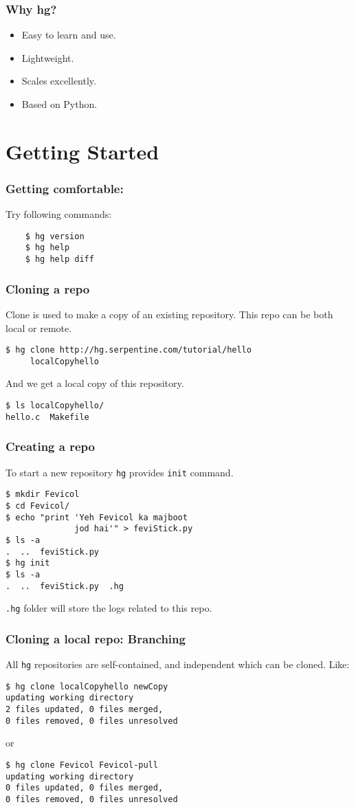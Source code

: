\documentclass[14pt,compress]{beamer}
\newcommand{\typ}[1]{\lstinline{#1}}
\begin{document}
\begin{frame}
  \frametitle{Why hg?}
  \begin{itemize}
  \item Easy to learn and use.
  \item Lightweight.
  \item Scales excellently.
  \item Based on Python.
  \end{itemize}
\end{frame}

\section{Getting Started}

\begin{frame}[fragile]
  \frametitle{Getting comfortable:}
  Try following commands:
  \begin{lstlisting}
    $ hg version    
    $ hg help
    $ hg help diff
  \end{lstlisting} %
\end{frame}

\begin{frame}[fragile]
  \frametitle{Cloning a repo}
  Clone is used to make a copy of an existing repository. This repo can be both local or remote.
  \begin{lstlisting}
$ hg clone http://hg.serpentine.com/tutorial/hello 
     localCopyhello
  \end{lstlisting}
  And we get a local copy of this repository. 
  \begin{lstlisting}
$ ls localCopyhello/
hello.c  Makefile
  \end{lstlisting}
\end{frame}

\begin{frame}[fragile]
  \frametitle{Creating a repo}
  To start a new repository \typ{hg} provides \typ{init} command.
  \begin{lstlisting}
$ mkdir Fevicol
$ cd Fevicol/
$ echo "print 'Yeh Fevicol ka majboot 
              jod hai'" > feviStick.py
$ ls -a
.  ..  feviStick.py
$ hg init
$ ls -a
.  ..  feviStick.py  .hg
  \end{lstlisting}
\typ{.hg} folder will store the logs related to this repo.
\end{frame}

\begin{frame}[fragile]
  \frametitle{Cloning a local repo: Branching}
  All \typ{hg} repositories are self-contained, and independent which can be cloned. Like:
  \begin{lstlisting}
$ hg clone localCopyhello newCopy
updating working directory
2 files updated, 0 files merged, 
0 files removed, 0 files unresolved
  \end{lstlisting}
or
  \begin{lstlisting}
$ hg clone Fevicol Fevicol-pull
updating working directory
0 files updated, 0 files merged, 
0 files removed, 0 files unresolved
  \end{lstlisting}
\end{frame}
\end{document}
